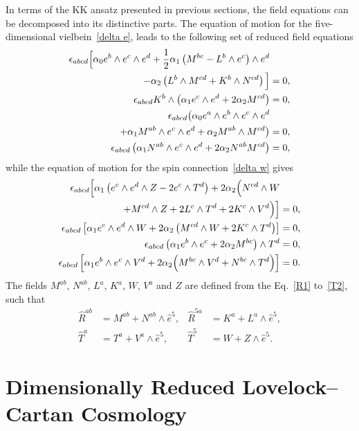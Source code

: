 \documentclass[aps,prd,12pt,superscriptaddress,showpacs,showkeys,longbibliography,reprint,nofootinbib]{revtex4-1}
\begin{document}
In terms of the KK ansatz presented in previous sections, the field equations can be decomposed into its distinctive parts. The equation of motion for the five-dimensional vielbein~\eqref{delta e}, leads to the following set of reduced field equations
\begin{align}\label{equation}
\epsilon_{abcd}\Big[\alpha_0 e^b\wedge e^c\wedge e^d + \frac{1}{2}\alpha_1\left(M^{bc}-L^b\wedge e^c\right)\wedge e^d&\notag\\
-\alpha_2\left(L^b\wedge M^{cd} + K^b\wedge N^{cd}\right)\Big]&=0,\\
\epsilon_{abcd}K^b\wedge\left(\alpha_1e^c\wedge e^d + 2\alpha_2M^{cd}\right)&=0,\\
\epsilon_{abcd}\big(\alpha_0 e^a\wedge e^b\wedge e^c\wedge e^d&\notag\\
+\alpha_1M^{ab}\wedge e^c\wedge e^d+\alpha_2M^{ab}\wedge M^{cd}\big)&=0,\\
\epsilon_{abcd}\left(\alpha_1N^{ab}\wedge e^c\wedge e^d+2\alpha_2N^{ab}M^{cd}\right)&=0,
\end{align}
while the equation of motion for the spin connection~\eqref{delta w} gives
\begin{align}
\epsilon_{abcd}\Big[\alpha_1\left(e^c\wedge e^d\wedge Z-2e^c\wedge T^d\right)
+2\alpha_2\Big(N^{cd}\wedge W&\notag\\
+M^{cd}\wedge Z+2L^c\wedge T^d
+2K^c\wedge V^d\Big)\Big]&=0,\\
\epsilon_{abcd}\left[\alpha_1e^c\wedge e^ d\wedge W+2\alpha_2\left(M^{cd}\wedge W+2K^c\wedge T^d\right)\right]&=0,\\
\epsilon_{abcd}\left(\alpha_1e^b\wedge e^c+2\alpha_2M^{bc}\right)\wedge T^d&=0,\\
\epsilon_{abcd}\left[\alpha_1e^b\wedge e^c\wedge V^d+2\alpha_2\Big(M^{bc}\wedge V^d+N^{bc}\wedge T^d\Big)\right]&=0.
\end{align}
The fields $M^{ab}$, $N^{ab}$, $L^a$, $K^a$, $W$, $V^a$ and $Z$ are defined from the Eq.~\eqref{R1} to~\eqref{T2}, such that
\begin{align*}
\hat{R}^{ab}&=M^{ab}+N^{ab}\wedge\hat{e}^5, & \hat{R}^{5a}&=K^a+L^a\wedge\hat{e}^5,\\
\hat{T}^a&=T^a+V^a\wedge\hat{e}^5, & \hat{T}^5&=W+Z\wedge\hat{e}^5.
\end{align*}


\section{Dimensionally Reduced Lovelock--Cartan Cosmology\label{cosmos}}
\end{document}
